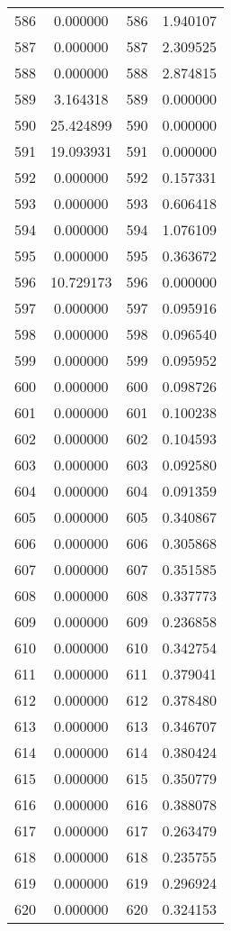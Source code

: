 \documentclass[12pt]{article}
\begin{document}
\begin{longtable}{@{}cccc@{}}
586 & 0.000000 & 586 & 1.940107 \\
587 & 0.000000 & 587 & 2.309525 \\
588 & 0.000000 & 588 & 2.874815 \\
589 & 3.164318 & 589 & 0.000000 \\
590 & 25.424899 & 590 & 0.000000 \\
591 & 19.093931 & 591 & 0.000000 \\
592 & 0.000000 & 592 & 0.157331 \\
593 & 0.000000 & 593 & 0.606418 \\
594 & 0.000000 & 594 & 1.076109 \\
595 & 0.000000 & 595 & 0.363672 \\
596 & 10.729173 & 596 & 0.000000 \\
597 & 0.000000 & 597 & 0.095916 \\
598 & 0.000000 & 598 & 0.096540 \\
599 & 0.000000 & 599 & 0.095952 \\
600 & 0.000000 & 600 & 0.098726 \\
601 & 0.000000 & 601 & 0.100238 \\
602 & 0.000000 & 602 & 0.104593 \\
603 & 0.000000 & 603 & 0.092580 \\
604 & 0.000000 & 604 & 0.091359 \\
605 & 0.000000 & 605 & 0.340867 \\
606 & 0.000000 & 606 & 0.305868 \\
607 & 0.000000 & 607 & 0.351585 \\
608 & 0.000000 & 608 & 0.337773 \\
609 & 0.000000 & 609 & 0.236858 \\
610 & 0.000000 & 610 & 0.342754 \\
611 & 0.000000 & 611 & 0.379041 \\
612 & 0.000000 & 612 & 0.378480 \\
613 & 0.000000 & 613 & 0.346707 \\
614 & 0.000000 & 614 & 0.380424 \\
615 & 0.000000 & 615 & 0.350779 \\
616 & 0.000000 & 616 & 0.388078 \\
617 & 0.000000 & 617 & 0.263479 \\
618 & 0.000000 & 618 & 0.235755 \\
619 & 0.000000 & 619 & 0.296924 \\
620 & 0.000000 & 620 & 0.324153 \\

\end{longtable}
\end{document}
